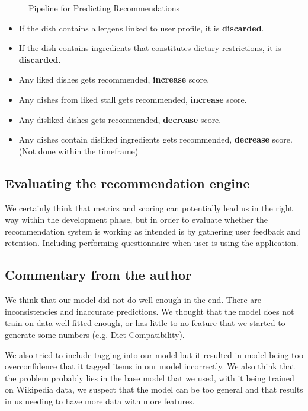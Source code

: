 \begin{figure}[h!]
    \centering
    
    \caption{Pipeline for Predicting Recommendations}
    \label{fig:pipeline-for-predicting-2}
\end{figure}

\begin{itemize}[leftmargin=80pt]
    \item If the dish contains allergens linked to user profile, it is \textbf{discarded}.
    \item If the dish contains ingredients that constitutes dietary restrictions, it is \textbf{discarded}.
    \item Any liked dishes gets recommended, \textbf{increase} score.
    \item Any dishes from liked stall gets recommended, \textbf{increase} score.
    \item Any disliked dishes gets recommended, \textbf{decrease} score.
    \item Any dishes contain disliked ingredients gets recommended, \textbf{decrease} score. (Not done within the timeframe)
\end{itemize}

\subsection{Evaluating the recommendation engine}
We certainly think that metrics and scoring can potentially lead us in
the right way within the development phase, but in order to evaluate
whether the recommendation system is working as intended is by gathering
user feedback and retention. Including performing questionnaire when user
is using the application.

\subsection{Commentary from the author}
We think that our model did not do well enough in the end. There are 
inconsistencies and inaccurate predictions. We thought that the model
does not train on data well fitted enough, or has little to no feature that
we started to generate some numbers (e.g. Diet Compatibility).

We also tried to include tagging into our model but it resulted in model being
too overconfidence that it tagged items in our model incorrectly. We also think that
the problem probably lies in the base model that we used, with it being trained
on Wikipedia data, we suspect that the model can be too general and that
results in us needing to have more data with more features.

